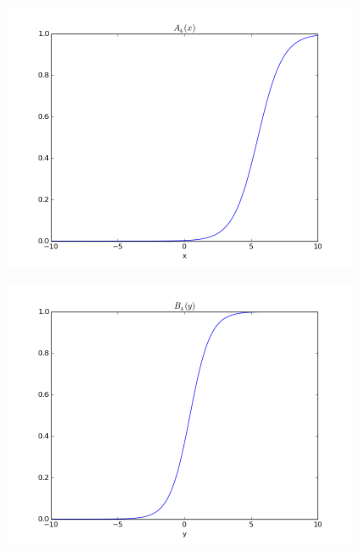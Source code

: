 \documentclass[paper=a4, fontsize=11pt]{scrartcl} %
\numberwithin{equation}{section} %
\numberwithin{figure}{section} %
\numberwithin{table}{section} %
\begin{document}
\begin{figure}[h]
\begin{subfigure}[b]{0.45\textwidth}
\includegraphics[width=\textwidth]{A_B/figure_7.png}
\end{subfigure}
\begin{subfigure}[b]{0.45\textwidth}
\includegraphics[width=\textwidth]{A_B/figure_8.png}
\end{subfigure}


\end{figure}
\end{document}

